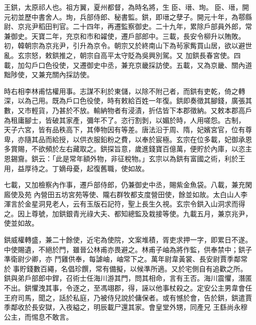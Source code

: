 \begin{pinyinscope}
 王鉷，太原祁人也。祖方翼，夏州都督，為時名將，生臣、瑨、珣。臣、瑨，開元初並歷中書舍人。珣，兵部侍郎、秘書監。鉷，即瑨之孽子。開元十年，為鄠縣尉、京兆尹稻田判官。二十四年，再遷監察御史。二十九年，累除戶部員外郎，常兼御史。天寶二年，充京和市和糴使，遷戶部郎中。三載，長安令柳升以賄敗。初，韓朝宗為京兆尹，引升為京令。朝宗又於終南山下為茍家觜買山居，欲以避世亂。玄宗怒，敕鉷推之，朝宗自高平太守貶為吳興別駕。又
 加鉷長春宮使。四載，加勾戶口色役使，又遷御史中丞，兼充京畿採訪使。五載，又為京畿、關內道黜陟使，又兼充關內採訪使。



 時右相李林甫怙權用事。志謀不利於東儲，以除不附己者，而鉷有吏乾，倚之轉深，以為己用。既為戶口色役使，時有敕給百姓一年復。鉷即奏徵其腳錢，廣張其數，又市輕貨，乃甚於不放。輸納物者有浸漬，折估皆下本郡徵納。又敕本郡高戶為租庸腳士，皆破其家產，彌年不了。恣行割剝，以媚於時，人用嗟怨。古制，
 天子六宮，皆有品秩高下，其俸物因有等差。唐法沿于周、隋，妃嬪宮官，位有尊卑，亦隨其品而給授，以供衣服鉛粉之費，以奉於宸極。玄宗在位多載，妃御承恩多賞賜，不欲頻於左右藏取之。鉷探旨意，歲進錢寶百億萬，便貯於內庫，以恣主恩錫齎。鉷云：「此是常年額外物，非征稅物。」玄宗以為鉷有富國之術，利於王用，益厚待之。丁嫡母憂，起復舊職，使如故。



 七載，又加檢察內作事，遷戶部侍郎，仍兼御史中丞，賜紫金魚袋。八載，兼充閑廄使及苑
 內營田五坊宮苑等使、隴右群牧都支度營田使，餘並如故。太白山人李渾言於金星洞見老人，云有玉版石記符，聖上長生久視。玄宗令鉷入山洞求而得之。因上尊號，加鉷銀青光祿大夫、都知總監及栽接等使。九載五月，兼京兆尹，使並如故。



 鉷威權轉盛，兼二十餘使，近宅為使院，文案堆積，胥吏求押一字，即累日不遂。中使賜遺，不絕於門，雖晉公林甫亦畏避之。林甫子岫為將作監，供奉禁中；鉷子準衛尉少卿，亦
 鬥雞供奉，每謔岫，岫常下之。萬年尉韋黃裳、長安尉賈季鄰常於事貯錢數百繩，名倡珍饌，常有備擬，以候準所適。又於宅側自有追歡之所。鉷與弟戶部郎中銲，召術士任海川游其門，問其相命，言有王否。海川震懼，潛匿不出。鉷懼洩其事，令逐之，至馮翊郡，得，誣以他事杖殺之。定安公主男韋會任王府司馬，聞之，話於私庭，乃被侍兒說於傭保者。或有憾於會，告於鉷，鉷遣賈季鄰收於長安獄，入夜縊之，明辰載尸還其家。會皇堂外甥，同產兄
 王繇尚永穆公主，而惕息不敢言。




\end{pinyinscope}

